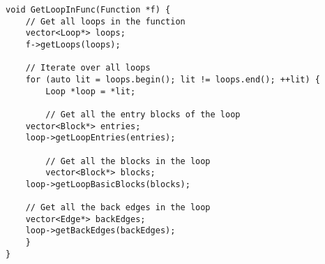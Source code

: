 \lstset{numbers=left, numberstyle=\tiny, stepnumber=5, numbersep=5pt}
\lstset{showstringspaces=false}
\begin{lstlisting}
void GetLoopInFunc(Function *f) {
    // Get all loops in the function
    vector<Loop*> loops;
    f->getLoops(loops);

    // Iterate over all loops
    for (auto lit = loops.begin(); lit != loops.end(); ++lit) {
        Loop *loop = *lit;

        // Get all the entry blocks of the loop
	vector<Block*> entries;
	loop->getLoopEntries(entries);

        // Get all the blocks in the loop
        vector<Block*> blocks;
	loop->getLoopBasicBlocks(blocks);

	// Get all the back edges in the loop
	vector<Edge*> backEdges;
	loop->getBackEdges(backEdges);
    }
}
\end{lstlisting}


